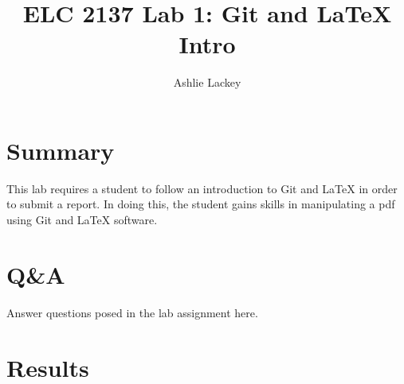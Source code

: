 \documentclass[11pt]{article}
\begin{document}
\title{ELC 2137 Lab 1: Git and LaTeX Intro}
\author{Ashlie Lackey}

\maketitle


\section*{Summary}

This lab requires a student to follow an introduction to Git and LaTeX in order to submit a report. In doing this, the student gains skills in manipulating a pdf using Git and LaTeX software.   


\section*{Q\&A}

Answer questions posed in the lab assignment here.


\section*{Results}
\end{document}
